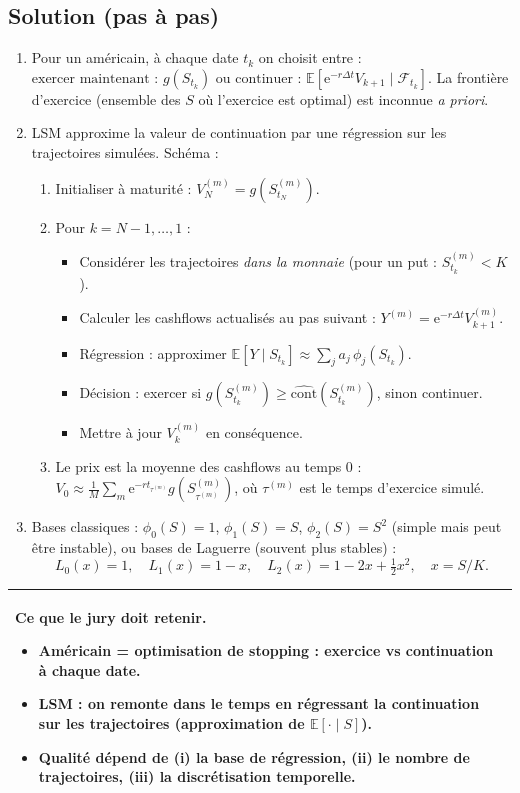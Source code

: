 \documentclass[11pt,a4paper]{report}
\newcommand{\ee}{\mathrm{e}}
\newcommand{\E}{\mathbb{E}}
\newcommand{\1}{\mathbbm{1}}
\newcommand{\F}{\mathcal{F}}
\theoremstyle{definition}
\theoremstyle{plain}
\theoremstyle{remark}
\newenvironment{jurybox}{%
  \begin{center}
  \setlength{\tabcolsep}{6pt}%
  \renewcommand{\arraystretch}{1.1}%
  \begin{tabular}{|p{0.94\textwidth}|}
  \hline
  \small\textbf{Ce que le jury doit retenir.}\par\medskip
}{%
  \\ \hline
  \end{tabular}
  \end{center}
}
\begin{document}
\subsection*{Solution (pas à pas)}
\begin{enumerate}[label=\alph*)]
  \item Pour un américain, à chaque date $t_k$ on choisit entre :
  \(\text{exercer maintenant : } g(S_{t_k})\) ou \(\text{continuer : } \E[\ee^{-r\Delta t}V_{k+1}\mid\F_{t_k}]\).
  La frontière d'exercice (ensemble des $S$ où l'exercice est optimal) est inconnue \emph{a priori}.
  \item LSM approxime la valeur de continuation par une régression sur les trajectoires simulées.
  Schéma :
  \begin{enumerate}[label=\roman*)]
    \item Initialiser à maturité : $V_N^{(m)}=g(S_{t_N}^{(m)})$.
    \item Pour $k=N-1,\dots,1$ :
      \begin{itemize}
        \item Considérer les trajectoires \emph{dans la monnaie} (pour un put : $S_{t_k}^{(m)}<K$).
        \item Calculer les cashflows actualisés au pas suivant : $Y^{(m)}=\ee^{-r\Delta t}V_{k+1}^{(m)}$.
        \item Régression : approximer $\E[Y\mid S_{t_k}]\approx \sum_{j} a_j\,\phi_j(S_{t_k})$.
        \item Décision : exercer si $g(S_{t_k}^{(m)}) \ge \widehat{\text{cont}}(S_{t_k}^{(m)})$, sinon continuer.
        \item Mettre à jour $V_k^{(m)}$ en conséquence.
      \end{itemize}
    \item Le prix est la moyenne des cashflows au temps 0 : $V_0\approx \frac{1}{M}\sum_m \ee^{-rt_{\tau^{(m)}}}g(S_{\tau^{(m)}}^{(m)})$, où $\tau^{(m)}$ est le temps d'exercice simulé.
  \end{enumerate}
  \item Bases classiques :
  \(\phi_0(S)=1\), \(\phi_1(S)=S\), \(\phi_2(S)=S^2\) (simple mais peut être instable),
  ou bases de Laguerre (souvent plus stables) :
  \[L_0(x)=1,\quad L_1(x)=1-x,\quad L_2(x)=1-2x+\tfrac12x^2,\quad x=S/K.
  \]
\end{enumerate}

\begin{jurybox}
\begin{itemize}
  \item Américain = optimisation de stopping : exercice vs continuation à chaque date.
  \item LSM : on remonte dans le temps en régressant la continuation sur les trajectoires (approximation de $\E[\cdot\mid S]$).
  \item Qualité dépend de (i) la base de régression, (ii) le nombre de trajectoires, (iii) la discrétisation temporelle.
\end{itemize}
\end{jurybox}
\end{document}
